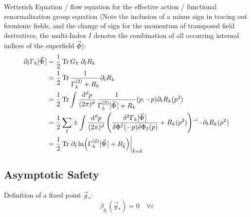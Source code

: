 		\noindent
		Wetterich Equation / flow equation for the effective action / functional renormalization group equation (Note the inclusion of a minus sign in tracing out fermionic fields, and the change of sign for the momentum of transposed field derivatives, the multi-Index $I$ denotes the combination of all occurring internal indices of the superfield $\vec{\Phi}$):
		\begin{equation}
			\begin{aligned}
				\partial_t \Gamma_k[\vec{\Phi}] 
				&= \frac{1}{2} \tr G_k \;\partial_t R_k \\
				&= \frac{1}{2} \tr \frac{1}{\Gamma^{(2)}_k + R_k} \partial_t R_k \\
				&= \frac{1}{2} \tr \int \frac{\dd^d p}{(2\pi)^d} \, \frac{1}{\Gamma^{(2)}_k[\vec{\Phi}] + R_k}(p,-p) \partial_t R_k(p^2) \\
				&= \frac{1}{2} \sum_I \pm \int \frac{\dd^d p}{(2\pi)^d} \, \inv{\qty(\frac{\delta^2 \Gamma_k[\vec{\Phi}]}{\delta \Phi^I(-p) \delta \Phi_I(p)} + R_k(p^2))} \cdot \partial_t R_k(p^2) \\
				&= \frac{1}{2} \tr \eval{\partial_{\tilde{t}} \ln(\Gamma^{(2)}_k[\vec{\Phi}] + R_{\tilde{k}})}_{\tilde{k} = k}
			\end{aligned}
		\end{equation}

	\subsection{Asymptotic Safety}
		\noindent
		Definition of a fixed point $\vec{g}_{*}$:
		\begin{equation}
			\beta_{g_i}(\vec{g}_{*}) = 0 \quad \forall i
		\end{equation}

